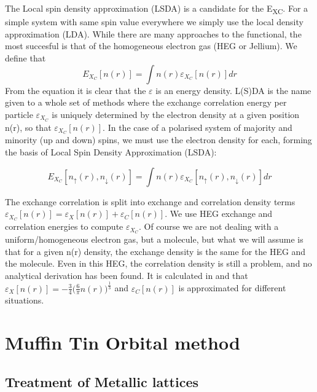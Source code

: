 \documentclass[12pt]{article}
\begin{document}
The Local spin density approximation (LSDA) is a candidate for the E\textsubscript{XC}. For a simple system with same spin value everywhere we simply use the local density approximation (LDA). While there are many approaches to the functional, the most succesful is that of the homogeneous electron gas (HEG or Jellium). %
We define that
$$E_X_C[n(r)]=\int n(r) \varepsilon_X_C[n(r)] dr$$
From the equation it is clear that the $\varepsilon$ is an energy density. L(S)DA is the name given to a whole set of methods where the exchange correlation energy per particle $\varepsilon_X_C$ is uniquely determined by the electron density at a given position n(r), so that $\varepsilon_X_C[n(r)]$.
In the case of a polarised system of majority and minority (up and down) spins, we must use the electron density for each, forming the basis of Local Spin Density Approximation (LSDA):

$$E_X_C[n_\uparrow(r),n_\downarrow(r)]=\int n(r) \varepsilon_X_C[n_\uparrow(r),n_\downarrow(r)] dr$$


The exchange correlation is split into exchange and correlation density terms $\varepsilon_X_C[n(r)]=\varepsilon_X[n(r)]+\varepsilon_C[n(r)]$.
We use HEG exchange and correlation energies to compute $\varepsilon_X_C$. Of course we are not dealing with a uniform/homogeneous electron gas, but a molecule, but what we will assume is that for a given n(r) density, the exchange density is the same for the HEG and the molecule. Even in this HEG, the correlation density is still a problem, and no analytical derivation has been found. It is calculated in \cite{martin} and \cite{exc} that $\varepsilon_X[n(r)]=-\frac{3}{4}\bigg(\frac{6}{\pi}n(r)\bigg)^\frac{1}{3}$ and $\varepsilon_C[n(r)]$ is approximated for different situations.

\clearpage
\section{Muffin Tin Orbital method}
\subsection{Treatment of Metallic lattices}
\end{document}
